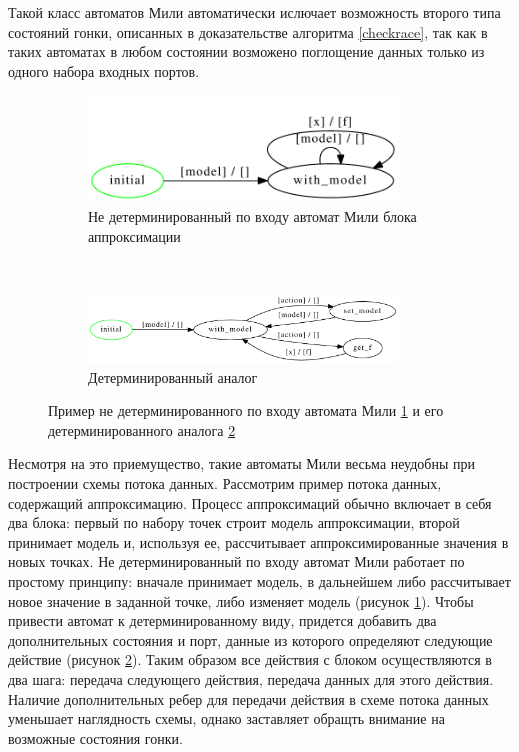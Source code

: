 \documentclass[10pt,a4paper]{article}
\begin{document}
    Такой класс автоматов Мили автоматически ислючает возможность второго типа состояний гонки, описанных в доказательстве алгоритма \ref{checkrace}, так
    как в таких автоматах в любом состоянии возможено поглощение данных только из одного набора входных портов.
    
  \begin{figure}[H]
  \centering

  \begin{subfigure}[b]{\textwidth}
    \centering
    \includegraphics[width=0.9\textwidth]{approx_fa.pdf}
    \caption{Не детерминированный по входу автомат Мили блока аппроксимации}
    \label{notdetFA}
  \end{subfigure}
  ~
  \begin{subfigure}[b]{\textwidth}
    \centering
    \includegraphics[width=0.9\textwidth]{approx_fa_det.pdf}
    \caption{Детерминированный аналог}
    \label{detFA}
  \end{subfigure}
  
  \caption{Пример не детерминированного по входу автомата Мили \ref{notdetFA} и его детерминированного аналога \ref{detFA}}
  \label{det_example}
  \end{figure}    
    
    Несмотря на это приемущество, такие автоматы Мили весьма неудобны при построении схемы потока данных.
    Рассмотрим пример потока данных, содержащий аппроксимацию. Процесс аппроксимаций обычно включает в себя два блока:
    первый по набору точек строит модель аппроксимации, второй принимает модель и, используя ее, рассчитывает аппроксимированные значения в новых точках.
    Не детерминированный по входу автомат Мили работает по простому принципу: вначале принимает модель, в дальнейшем либо рассчитывает новое значение в заданной точке,
    либо изменяет модель (рисунок \ref{notdetFA}). Чтобы привести автомат к детерминированному виду, придется добавить два дополнительных состояния и порт, данные из которого
    определяют следующие действие (рисунок \ref{detFA}). Таким образом все действия с блоком осуществляются в два шага: передача следующего действия,
    передача данных для этого действия.
    Наличие дополнительных ребер для передачи действия в схеме потока данных уменьшает наглядность схемы, однако заставляет обращть внимание на возможные состояния гонки.
\end{document}
